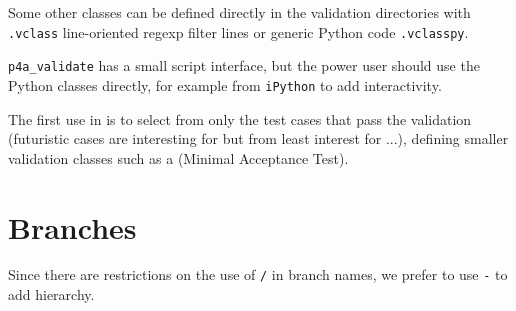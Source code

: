 \documentclass[a4paper]{article}
\begin{document}
Some other classes can be defined directly in the validation directories
with \texttt{.vclass} line-oriented regexp filter lines or
generic Python code \texttt{.vclasspy}.

\verb|p4a_validate| has a small script interface, but the power user
should use the Python classes directly, for example from \texttt{iPython}
to add interactivity.

The first use in \Apfa is to select from \Apips only the test cases that
pass the validation (futuristic cases are interesting for \Apips but from
least interest for \Apfa...), defining smaller validation classes such as
a \Amat (Minimal Acceptance Test).


\section{Branches}
\label{sec:branches}

Since there are restrictions on the use of \texttt{/} in branch names, we
prefer to use \texttt{-} to add hierarchy.
\end{document}
